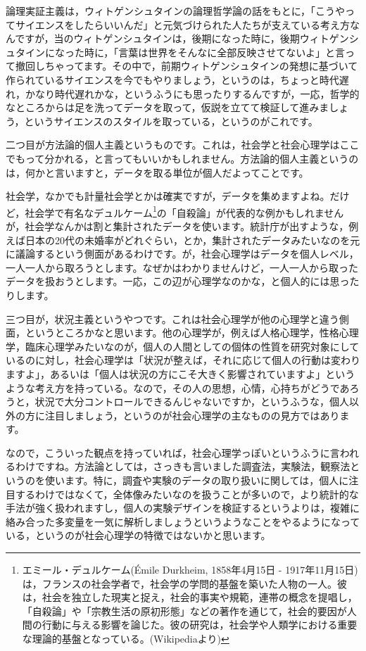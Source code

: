 \documentclass{ltjsbook}
\begin{document}
論理実証主義は，ウィトゲンシュタインの論理哲学論の話をもとに，「こうやってサイエンスをしたらいいんだ」と元気づけられた人たちが支えている考え方なんですが，当のウィトゲンシュタインは，後期になった時に，後期ウィトゲンシュタインになった時に，「言葉は世界をそんなに全部反映させてないよ」と言って撤回しちゃってます。その中で，前期ウィトゲンシュタインの発想に基づいて作られているサイエンスを今でもやりましょう，というのは，ちょっと時代遅れ，かなり時代遅れかな，というふうにも思ったりするんですが，一応，哲学的なところからは足を洗ってデータを取って，仮説を立てて検証して進みましょう，というサイエンスのスタイルを取っている，というのがこれです。

二つ目が方法論的個人主義というものです。これは，社会学と社会心理学はここでもって分かれる，と言ってもいいかもしれません。方法論的個人主義というのは，何かと言いますと，データを取る単位が個人だよってことです。

社会学，なかでも計量社会学とかは確実ですが，データを集めますよね。だけど，社会学で有名なデュルケーム\footnote{エミール・デュルケーム(Émile Durkheim, 1858年4月15日 - 1917年11月15日)は，フランスの社会学者で，社会学の学問的基盤を築いた人物の一人。彼は，社会を独立した現実と捉え，社会的事実や規範，連帯の概念を提唱し，「自殺論」や「宗教生活の原初形態」などの著作を通じて，社会的要因が人間の行動に与える影響を論じた。彼の研究は，社会学や人類学における重要な理論的基盤となっている。(Wikipediaより)}の「自殺論」\parencite{SPjisaturon}が代表的な例かもしれませんが，社会学なんかは割と集計されたデータを使います。統計庁が出すような，例えば日本の20代の未婚率がどれぐらい，とか，集計されたデータみたいなのを元に議論するという側面があるわけです。が，社会心理学はデータを個人レベル，一人一人から取ろうとします。なぜかはわかりませんけど，一人一人から取ったデータを扱おうとします。一応，この辺が心理学なのかな，と個人的には思ったりします。

三つ目が，状況主義というやつです。これは社会心理学が他の心理学と違う側面，というところかなと思います。他の心理学が，例えば人格心理学，性格心理学，臨床心理学みたいなのが，個人の人間としての個体の性質を研究対象にしているのに対し，社会心理学は「状況が整えば，それに応じて個人の行動は変わりますよ」，あるいは「個人は状況の方にこそ大きく影響されていますよ」というような考え方を持っている。なので，その人の思想，心情，心持ちがどうであろうと，状況で大分コントロールできるんじゃないですか，というふうな，個人以外の方に注目しましょう，というのが社会心理学の主なものの見方ではあります。

なので，こういった観点を持っていれば，社会心理学っぽいというふうに言われるわけですね。方法論としては，さっきも言いました調査法，実験法，観察法というのを使います。特に，調査や実験のデータの取り扱いに関しては，個人に注目するわけではなくて，全体像みたいなのを扱うことが多いので，より統計的な手法が強く扱われますし，個人の実験デザインを検証するというよりは，複雑に絡み合った多変量を一気に解析しましょうというようなことをやるようになっている，というのが社会心理学の特徴ではないかと思います。
\end{document}
